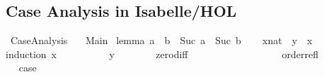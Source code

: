 %
\begin{isabellebody}%
%
%
\begin{isamarkuptext}%
\section*{Case Analysis in Isabelle/HOL}%
\end{isamarkuptext}\isamarkuptrue%
%
\isadelimtheory
%
\endisadelimtheory
%
\isatagtheory
{}\isamarkupfalse%
\ CaseAnalysis\isanewline
\ \ \ Main\isanewline
{}%
\endisatagtheory
{\isafoldtheory}%
%
\isadelimtheory
%
\endisadelimtheory
\isanewline
\isanewline
{}\isamarkupfalse%
\ lemma{}{\isacharcolon}{\kern0pt}\ {\isachardoublequoteopen}a\ {\isasymle}\ b\ {\isasymLongrightarrow}\ Suc\ a\ {\isasymle}\ Suc\ b{\isachardoublequoteclose}\isanewline
%
\isadelimproof
\ \ %
\endisadelimproof
%
\isatagproof
{}\isamarkupfalse%
%
\endisatagproof
{\isafoldproof}%
%
\isadelimproof
\isanewline
%
\endisadelimproof
\isanewline
{}\isamarkupfalse%
\ {\isachardoublequoteopen}{\isacharparenleft}{\kern0pt}x{\isacharcolon}{\kern0pt}{\isacharcolon}{\kern0pt}nat{\isacharparenright}{\kern0pt}\ {\isacharminus}{\kern0pt}\ y\ {\isasymle}\ x{\isachardoublequoteclose}\isanewline
%
\isadelimproof
%
\endisadelimproof
%
\isatagproof
{}\isamarkupfalse%
{\isacharparenleft}{\kern0pt}induction\ x{\isacharparenright}{\kern0pt}\isanewline
\ \ \isamarkupfalse%
\ {}\isanewline
\ \ \isamarkupfalse%
\ {\isachardoublequoteopen}{}\ {\isacharminus}{\kern0pt}\ y\ {\isacharequal}{\kern0pt}\ {}{\isachardoublequoteclose}\isanewline
\ \ \ \ \isamarkupfalse%
\ zero{\isacharunderscore}{\kern0pt}diff\isanewline
\ \ \ \ \isacommand{{\isachardot}{\kern0pt}}\isamarkupfalse%
\isanewline
\ \ \isamarkupfalse%
\ \isamarkupfalse%
\ {\isachardoublequoteopen}{\isachardot}{\kern0pt}{\isachardot}{\kern0pt}{\isachardot}{\kern0pt}\ {\isasymle}\ {}{\isachardoublequoteclose}\isanewline
\ \ \ \ \isamarkupfalse%
\ order{\isachardot}{\kern0pt}refl\isanewline
\ \ \ \ \isacommand{{\isachardot}{\kern0pt}}\isamarkupfalse%
\isanewline
\ \ \isamarkupfalse%
\ \isamarkupfalse%
\ {\isacharquery}{\kern0pt}case\isanewline
\ \ \ \ \isacommand{{\isachardot}{\kern0pt}}\isamarkupfalse%
\ \isanewline
{}\isamarkupfalse%

\end{isabellebody}
